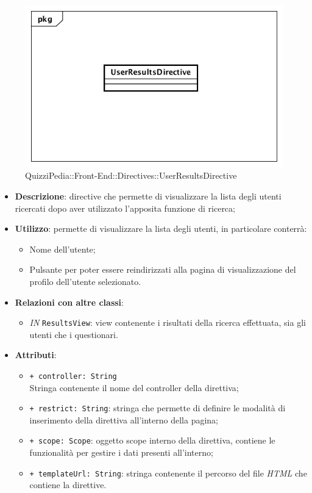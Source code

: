 \begin{figure}[h]
	\centering
	\includegraphics[scale=0.5,keepaspectratio]{UML/Classi/Front-End/QuizziPedia_Front-end_Directives_UserResultsDirective.png}
	\caption{QuizziPedia::Front-End::Directives::UserResultsDirective}
\end{figure}

\begin{itemize}
	\item \textbf{Descrizione}: directive che permette di visualizzare la lista degli utenti ricercati dopo aver utilizzato l'apposita funzione di ricerca;
	\item \textbf{Utilizzo}: permette di visualizzare la lista degli utenti, in particolare conterrà:
	\begin{itemize}
		\item Nome dell'utente;
		\item Pulsante per poter essere reindirizzati alla pagina di visualizzazione del profilo dell'utente selezionato.
	\end{itemize}
	\item \textbf{Relazioni con altre classi}:
	\begin{itemize}
		\item \textit{IN} \texttt{ResultsView}: view contenente i risultati della ricerca effettuata, sia gli utenti che i questionari.
	\end{itemize}
	\item \textbf{Attributi}:
	\begin{itemize}
		\item \texttt{+ controller: String} \\ Stringa contenente il nome del controller della direttiva;
		\item \texttt{+ restrict: String}: stringa che permette di definire le modalità di inserimento della direttiva all'interno della pagina;
		\item \texttt{+ scope: Scope}: oggetto scope interno della direttiva, contiene le funzionalità per gestire i dati presenti all'interno;
		\item \texttt{+ templateUrl: String}: stringa contenente il percorso del file \textit{HTML} che contiene la direttive.
	\end{itemize}
\end{itemize}

